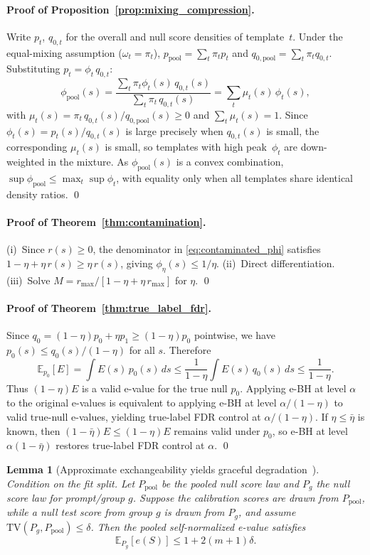 \documentclass{article}
\newtheorem{lemma}{Lemma}
\theoremstyle{remark}
\newcommand{\E}{\mathbb{E}}
\newcommand{\1}{\mathbf{1}}
\begin{document}
\paragraph{Proof of Proposition~\ref{prop:mixing_compression}.}
Write $p_t$, $q_{0,t}$ for the overall and null score densities of template~$t$.
Under the equal-mixing assumption ($\omega_t=\pi_t$), $p_{\mathrm{pool}}=\sum_t\pi_t p_t$
and $q_{0,\mathrm{pool}}=\sum_t\pi_t q_{0,t}$.
Substituting $p_t=\phi_t\,q_{0,t}$:
\[
\phi_{\mathrm{pool}}(s)
=\frac{\sum_t\pi_t\phi_t(s)\,q_{0,t}(s)}{\sum_t\pi_t\,q_{0,t}(s)}
=\sum_t\mu_t(s)\,\phi_t(s),
\]
with $\mu_t(s)=\pi_t\,q_{0,t}(s)/q_{0,\mathrm{pool}}(s)\ge 0$ and
$\sum_t\mu_t(s)=1$. Since $\phi_t(s)=p_t(s)/q_{0,t}(s)$ is large
precisely when $q_{0,t}(s)$ is small, the corresponding $\mu_t(s)$
is small, so templates with high peak~$\phi_t$ are down-weighted in
the mixture. As $\phi_{\mathrm{pool}}(s)$ is a convex combination,
$\sup\phi_{\mathrm{pool}}\le\max_t\sup\phi_t$, with equality only
when all templates share identical density ratios. \qed

\paragraph{Proof of Theorem~\ref{thm:contamination}.}
(i)~Since $r(s) \ge 0$, the denominator in \eqref{eq:contaminated_phi}
satisfies $1-\eta+\eta\,r(s) \ge \eta\,r(s)$, giving
$\phi_\eta(s) \le 1/\eta$.
(ii)~Direct differentiation.
(iii)~Solve $M = r_{\max}/[1-\eta+\eta\,r_{\max}]$ for $\eta$. \qed

\paragraph{Proof of Theorem~\ref{thm:true_label_fdr}.}
Since $q_0=(1-\eta)p_0+\eta p_1 \ge (1-\eta)p_0$ pointwise, we have
$p_0(s) \le q_0(s)/(1-\eta)$ for all $s$. Therefore
\[
\mathbb{E}_{p_0}[E]
=
\int E(s)\,p_0(s)\,ds
\le
\frac{1}{1-\eta}\int E(s)\,q_0(s)\,ds
\le
\frac{1}{1-\eta}.
\]
Thus $(1-\eta)E$ is a valid e-value for the true null $p_0$. Applying e-BH at
level $\alpha$ to the original e-values is equivalent to applying e-BH at level
$\alpha/(1-\eta)$ to valid true-null e-values, yielding true-label FDR control
at $\alpha/(1-\eta)$. If $\eta\le\bar{\eta}$ is known, then
$(1-\bar{\eta})E \le (1-\eta)E$ remains valid under $p_0$, so e-BH at level
$\alpha(1-\bar{\eta})$ restores true-label FDR control at $\alpha$. \qed

\begin{lemma}[Approximate exchangeability yields graceful degradation~\cite{barber2023conformal}]
\label{lem:approx_exchangeability}
Condition on the fit split. Let $P_{\mathrm{pool}}$ be the pooled null score
law and $P_g$ the null score law for prompt/group $g$. Suppose the calibration
scores are drawn from $P_{\mathrm{pool}}$, while a null test score from group
$g$ is drawn from $P_g$, and assume $\mathrm{TV}(P_g,P_{\mathrm{pool}})\le\delta$.
Then the pooled self-normalized e-value satisfies
\[
\E_{P_g}[e(S)] \le 1 + 2(m+1)\delta.
\]
\end{lemma}
\end{document}
